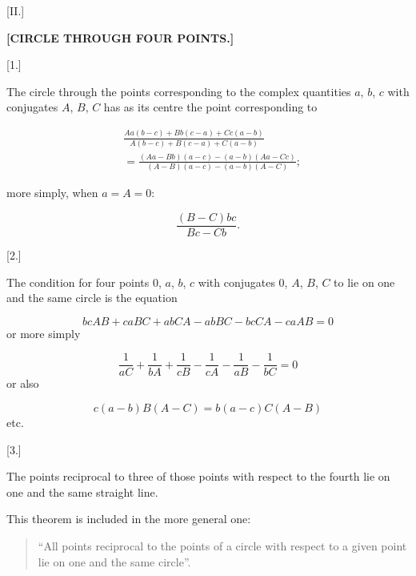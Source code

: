 
\begin{center}
[II.]

\textbf{[CIRCLE THROUGH FOUR POINTS.]}

[1.]
\end{center}

The circle through the points corresponding to the complex quantities $a$, $b$, $c$ with conjugates $A$, $B$, $C$ has as its centre the point corresponding to

\[
\begin{aligned}
&\frac{Aa(b-c)+Bb(c-a)+Cc(a-b)}{A(b-c)+B(c-a)+C(a-b)} \\
&= \frac{(Aa-Bb)(a-c)-(a-b)(Aa-Cc)}{(A-B)(a-c)-(a-b)(A-C)};
\end{aligned}
\]

more simply, when $a=A=0$:

\[
\frac{(B-C)bc}{Bc-Cb}.
\]

\begin{center}
[2.]
\end{center}

The condition for four points $0$, $a$, $b$, $c$ with conjugates
$0$, $A$, $B$, $C$ to lie on one and the same circle is the equation

\[
bcAB+caBC+abCA-abBC-bcCA-caAB = 0
\]
or more simply

\[
\frac{1}{aC}+\frac{1}{bA}+\frac{1}{cB}-\frac{1}{cA}-\frac{1}{aB}-\frac{1}{bC} = 0
\]
or also

\[
c(a-b)B(A-C) = b(a-c)C(A-B)
\]
etc.

\begin{center}
[3.]
\end{center}

The points reciprocal to three of those points with respect to the fourth
lie on one and the same straight line.

This theorem is included in the more general one:

\begin{quote}
“All points reciprocal to the points of a circle with respect to a given
point lie on one and the same circle”.
\end{quote}
